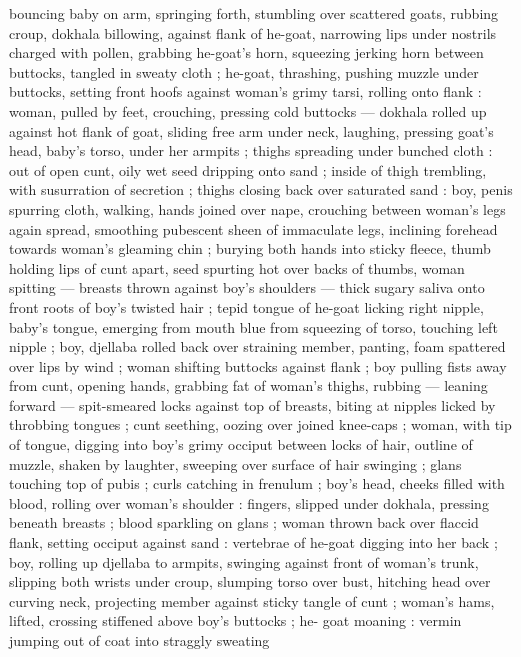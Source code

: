 bouncing baby on arm, springing forth, stumbling over scattered 
goats, rubbing croup, dokhala billowing, against flank of he-goat, 
narrowing lips under nostrils charged with pollen, grabbing he-goat's 
horn, squeezing jerking horn between buttocks, tangled in sweaty 
cloth ; he-goat, thrashing, pushing muzzle under buttocks, setting 
front hoofs against woman's grimy tarsi, rolling onto flank : woman, 
pulled by feet, crouching, pressing cold buttocks --- dokhala rolled 
up against hot flank of goat, sliding free arm under neck, laughing, 
pressing goat's head, baby's torso, under her armpits ; thighs 
spreading under bunched cloth : out of open cunt, oily wet seed 
dripping onto sand ; inside of thigh trembling, with susurration of 
secretion ; thighs closing back over saturated sand : boy, penis 
spurring cloth, walking, hands joined over nape, crouching between 
woman's legs again spread, smoothing pubescent sheen of 
immaculate legs, inclining forehead towards woman's gleaming chin 
; burying both hands into sticky fleece, thumb holding lips of cunt 
apart, seed spurting hot over backs of thumbs, woman spitting --- 
breasts thrown against boy's shoulders --- thick sugary saliva onto 
front roots of boy's twisted hair ; tepid tongue of he-goat licking 
right nipple, baby's tongue, emerging from mouth blue from 
squeezing of torso, touching left nipple ; boy, djellaba rolled back 
over straining member, panting, foam spattered over lips by wind ; 
woman shifting buttocks against flank ; boy pulling fists away from 
cunt, opening hands, grabbing fat of woman's thighs, rubbing --- 
leaning forward --- spit-smeared locks against top of breasts, biting 
at nipples licked by throbbing tongues ; cunt seething, oozing over 
joined knee-caps ; woman, with tip of tongue, digging into boy's 
grimy occiput between locks of hair, outline of muzzle, shaken by 
laughter, sweeping over surface of hair swinging ; glans touching top 
of pubis ; curls catching in frenulum ; boy's head, cheeks filled with 
blood, rolling over woman's shoulder : fingers, slipped under 
dokhala, pressing beneath breasts ; blood sparkling on glans ; 
woman thrown back over flaccid flank, setting occiput against sand : 
vertebrae of he-goat digging into her back ; boy, rolling up djellaba 
to armpits, swinging against front of woman's trunk, slipping both 
wrists under croup, slumping torso over bust, hitching head over 
curving neck, projecting member against sticky tangle of cunt ; 
woman's hams, lifted, crossing stiffened above boy's buttocks ; he- 
goat moaning : vermin jumping out of coat into straggly sweating 
